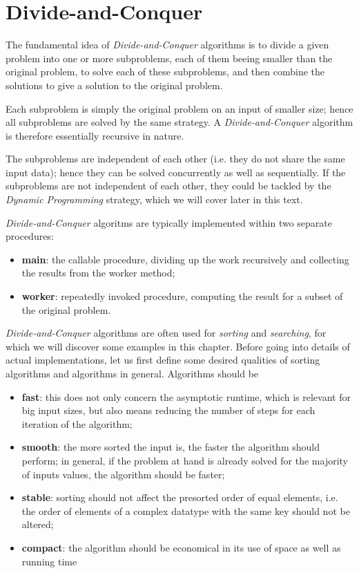 \chapter{Divide-and-Conquer}

The fundamental idea of \emph{Divide-and-Conquer} algorithms is to divide a given problem into one or more subproblems, each of them beeing smaller than the original problem, to solve each of these subproblems, and then combine the solutions to give a solution to the original problem.

Each subproblem is simply the original problem on an input of smaller size; hence all subproblems are solved by the same strategy. A \emph{Divide-and-Conquer} algorithm is therefore essentially recursive in nature.

The subproblems are independent of each other (i.e. they do not share the same input data); hence they can be solved concurrently as well as sequentially. If the subproblems are not independent of each other, they could be tackled by the \emph{Dynamic Programming} strategy, which we will cover later in this text.

\emph{Divide-and-Conquer} algoritms are typically implemented within two separate procedures:
\begin{itemize}
\item \textbf{main}: the callable procedure, dividing up the work recursively and collecting the results from the worker method;
\item \textbf{worker}: repeatedly invoked procedure, computing the result for a subset of the original problem.
\end{itemize}

\emph{Divide-and-Conquer} algorithms are often used for \emph{sorting} and \emph{searching}, for which we will discover some examples in this chapter.
Before going into details of actual implementations, let us first define some desired qualities of sorting algorithms and algorithms in general. Algorithms should be
\begin{itemize}
\item \textbf{fast}: this does not only concern the asymptotic runtime, which is relevant for big input sizes, but also means reducing the number of steps for each iteration of the algorithm; 
\item \textbf{smooth}: the more sorted the input is, the faster the algorithm should perform; in general, if the problem at hand is already solved for the majority of inputs values, the algorithm should be faster;
\item \textbf{stable}: sorting should not affect the presorted order of equal elements, i.e. the order of elements of a complex datatype with the same key should not be altered;
\item \textbf{compact}: the algorithm should be economical in its use of space as well as running time
\end{itemize}

